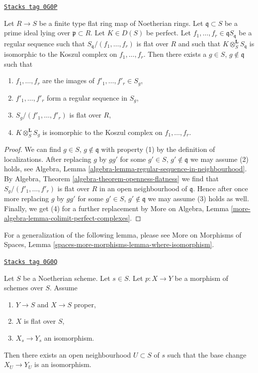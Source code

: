 \begin{lemma}
\label{equiv-lemma-limit-arguments}
\href{https://stacks.math.columbia.edu/tag/0G0P}{\texttt{Stacks tag 0G0P}}

Let $R \to S$ be a finite type flat ring map of Noetherian rings.
Let $\mathfrak q \subset S$ be a prime ideal lying over
$\mathfrak p \subset R$. Let $K \in D(S)$ be perfect.
Let $f_1, \ldots, f_r \in \mathfrak q S_\mathfrak q$
be a regular sequence such that $S_\mathfrak q/(f_1, \ldots, f_r)$
is flat over $R$ and such that
$K \otimes_S^\mathbf{L} S_\mathfrak q$ is isomorphic to the
Koszul complex on $f_1, \ldots, f_r$. Then there exists a
$g \in S$, $g \not \in \mathfrak q$ such that
\begin{enumerate}
\item $f_1, \ldots, f_r$ are the images of
$f'_1, \ldots, f'_r \in S_g$,
\item $f'_1, \ldots, f'_r$ form a regular sequence in $S_g$,
\item $S_g/(f'_1, \ldots, f'_r)$ is flat over $R$,
\item $K \otimes_S^\mathbf{L} S_g$ is isomorphic to the
Koszul complex on $f_1, \ldots, f_r$.
\end{enumerate}
\end{lemma}

\begin{proof}
We can find $g \in S$, $g \not \in \mathfrak q$ with property (1) by
the definition of localizations. After replacing $g$ by
$gg'$ for some $g' \in S$, $g' \not \in \mathfrak q$
we may assume (2) holds, see
Algebra, Lemma \ref{algebra-lemma-regular-sequence-in-neighbourhood}.
By Algebra, Theorem \ref{algebra-theorem-openness-flatness}
we find that $S_g/(f'_1, \ldots, f'_r)$ is flat over $R$
in an open neighbourhood of $\mathfrak q$.
Hence after once more replacing $g$ by $gg'$ for some
$g' \in S$, $g' \not \in \mathfrak q$ we may assume (3) holds as well.
Finally, we get (4) for a further replacement by
More on Algebra, Lemma \ref{more-algebra-lemma-colimit-perfect-complexes}.
\end{proof}

For a generalization of the following lemma, please see
More on Morphisms of Spaces, Lemma
\ref{spaces-more-morphisms-lemma-where-isomorphism}.

\begin{lemma}
\label{equiv-lemma-isomorphism-in-neighbourhood}
\href{https://stacks.math.columbia.edu/tag/0G0Q}{\texttt{Stacks tag 0G0Q}}

Let $S$ be a Noetherian scheme. Let $s \in S$.
Let $p : X \to Y$ be a morphism of schemes over $S$.
Assume
\begin{enumerate}
\item $Y \to S$ and $X \to S$ proper,
\item $X$ is flat over $S$,
\item $X_s \to Y_s$ an isomorphism.
\end{enumerate}
Then there exists an open neighbourhood $U \subset S$ of $s$
such that the base change $X_U \to Y_U$ is an isomorphism.
\end{lemma}

